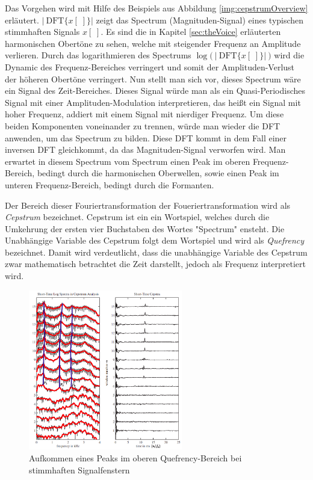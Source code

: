 Das Vorgehen wird mit Hilfe des Beispiels aus Abbildung \ref{img:cepstrumOverview} erläutert. $ |\ \text{DFT}\{x[\;]\} \big| $  zeigt das Spectrum (Magnituden-Signal) eines \glqq typischen stimmhaften\grqq{} Signals $x[\;]$. Es sind die in Kapitel \ref{sec:theVoice} erläuterten harmonischen Obertöne zu sehen, welche mit steigender Frequenz an Amplitude verlieren. Durch das logarithmieren des Spectrums $\log \Big(\ \big|\ \text{DFT}\{x[\;]\} \big|\ \Big)$ wird die Dynamic des Frequenz-Bereiches verringert und somit der Amplituden-Verlust der höheren Obertöne verringert. Nun stellt man sich vor, dieses Spectrum wäre ein Signal des Zeit-Bereiches. Dieses Signal würde man als ein Quasi-Periodisches Signal mit einer Amplituden-Modulation interpretieren, das heißt ein Signal mit hoher Frequenz, addiert mit einem Signal mit nierdiger Frequenz. Um diese beiden Komponenten voneinander zu trennen, würde man wieder die DFT anwenden, um das Spectrum zu bilden. Diese DFT kommt in dem Fall einer inversen DFT gleichkommt, da das Magnituden-Signal verworfen wird. Man erwartet in diesem \glqq Spectrum vom Spectrum\grqq{} einen Peak im \glqq oberen Frequenz-Bereich\grqq , bedingt durch die harmonischen Oberwellen, sowie einen Peak im  \glqq unteren Frequenz-Bereich\grqq, bedingt durch die Formanten.\cite[Cepstral analysis]{ricardo_ceps}

Der Bereich dieser \glqq Fouriertransformation der Foueriertransformation\grqq{} wird als \emph{Cepstrum} bezeichnet. Cepstrum ist ein ein Wortspiel, welches durch die Umkehrung der ersten vier Buchstaben des Wortes "Spectrum" ensteht. Die Unabhängige Variable des Cepstrum folgt dem Wortspiel und wird als \emph{Quefrency} bezeichnet. Damit wird verdeutlicht, dass die unabhängige Variable des Cepstrum zwar mathematisch betrachtet die Zeit darstellt, jedoch als Frequenz interpretiert wird.\cite[S. 7]{ricardo_ceps}

\begin{figure}[h]
	\centering
	\includegraphics[width=0.6\textwidth]{bilder/cepstrum05.png}
	\caption{Aufkommen eines Peaks im oberen Quefrency-Bereich bei stimmhaften Signalfenstern \cite[S. 17]{ricardo_ceps}}
	\label{img:cepstrumVoicedPeak}
\end{figure}	

